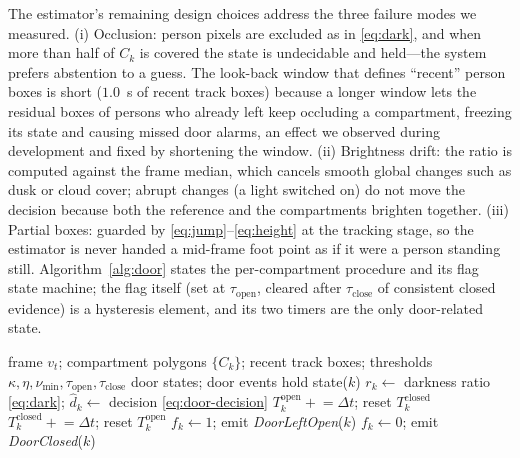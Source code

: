 \documentclass[journal,article,submit,oneauthor]{Definitions/mdpi}
\begin{document}
The estimator's remaining design choices address the three failure modes we measured.
(i) Occlusion: person pixels are excluded as in \eqref{eq:dark}, and when more than half of
$C_k$ is covered the state is undecidable and held---the system prefers abstention to a
guess. The look-back window that defines ``recent'' person boxes is short
($1.0$~s of recent track boxes) because a longer window lets the residual boxes of persons
who already left keep occluding a compartment, freezing its state and causing missed door
alarms, an effect we observed during development and fixed by shortening the window.
(ii) Brightness drift: the ratio is computed against the frame median, which cancels
smooth global changes such as dusk or cloud cover; abrupt changes (a light switched on) do
not move the decision because both the reference and the compartments brighten together.
(iii) Partial boxes: guarded by \eqref{eq:jump}--\eqref{eq:height} at the tracking stage,
so the estimator is never handed a mid-frame foot point as if it were a person standing
still. Algorithm~\ref{alg:door} states the per-compartment procedure and its flag state
machine; the flag itself (set at $\tau_{\mathrm{open}}$, cleared after
$\tau_{\mathrm{close}}$ of consistent closed evidence) is a hysteresis element, and its two
timers are the only door-related state.

\begin{algorithm}[H]
\caption{Per-compartment door state and flag state machine (per frame).}
\label{alg:door}
\begin{algorithmic}[1]
\Require frame $v_t$; compartment polygons $\{C_k\}$; recent track boxes; thresholds
$\kappa, \eta, \nu_{\min}, \tau_{\mathrm{open}}, \tau_{\mathrm{close}}$
\Ensure door states; door events
   hold state($k$) 
  \Else
    \State $r_k \gets$ darkness ratio \eqref{eq:dark}; $\hat{d}_k \gets$ decision
           \eqref{eq:door-decision}
  \EndIf
   $T^{\mathrm{open}}_k \mathrel{+}= \Delta t$; reset
      $T^{\mathrm{closed}}_k$ \Else\ $T^{\mathrm{closed}}_k \mathrel{+}= \Delta t$; reset
      $T^{\mathrm{open}}_k$ \EndIf
   $f_k \gets 1$;
      emit \emph{DoorLeftOpen}($k$)
  \EndIf
   $f_k \gets 0$;
      emit \emph{DoorClosed}($k$)
  \EndIf
\EndFor
\end{algorithmic}
\end{algorithm}
\end{document}
